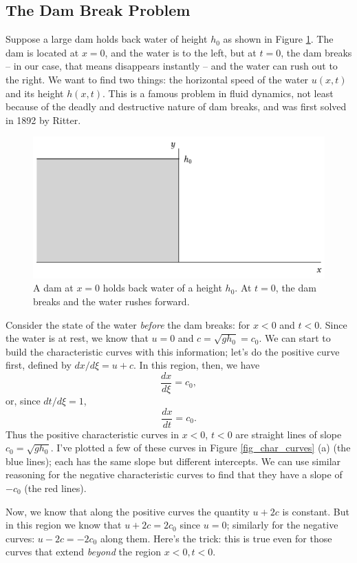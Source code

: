 \subsection{The Dam Break Problem}

Suppose a large dam holds back water of height $h_0$ as shown in Figure \ref{fig_dam_start}.  The dam is located at $x=0$, and the water is to the left, but at $t=0$, the dam breaks -- in our case, that means disappears instantly -- and the water can rush out to the right.  We want to find two things: the horizontal speed of the water $u(x, t)$ and its height $h(x, t)$.  This is a famous problem in fluid dynamics, not least because of the deadly and destructive nature of dam breaks, and was first solved in 1892 by Ritter.

\begin{figure}
\centering
\includegraphics[width=0.9\linewidth]{Figures/Chapter6/fig_dam_start}
\caption{A dam at $x=0$ holds back water of a height $h_0$.  At $t=0$, the dam breaks and the water rushes forward.}
\label{fig_dam_start}
\end{figure}

Consider the state of the water \emph{before} the dam breaks:  for $x<0$ and $t<0$.  Since the water is at rest, we know that $u = 0$ and $c = \sqrt{gh_0} = c_0$.  We can start to build the characteristic curves with this information; let's do the positive curve first, defined by $dx/d\xi = u+c$.  In this region, then, we have
\[
\frac{dx}{d\xi} = c_0,
\]
or, since $dt/d\xi = 1$, 
\[
\frac{dx}{dt} = c_0.
\]
Thus the positive characteristic curves in $x<0$, $t<0$ are straight lines of slope $c_0 = \sqrt{gh_0}$.  I've plotted a few of these curves in Figure \ref{fig_char_curves} (a) (the blue lines); each has the same slope but different intercepts.  We can use similar reasoning for the negative characteristic curves to find that they have a slope of $-c_0$ (the red lines).

Now, we know that along the positive curves the quantity $u + 2c$ is constant.  But in this region we know that $u + 2c = 2c_0$ since $u=0$; similarly for the negative curves: $u - 2c = -2c_0$ along them.  Here's the trick: this is true even for those curves that extend \emph{beyond} the region $x<0, t<0$.

